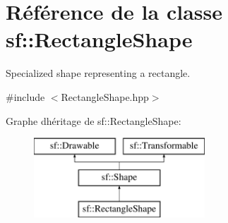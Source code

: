 \hypertarget{classsf_1_1RectangleShape}{}\section{Référence de la classe sf\+:\+:Rectangle\+Shape}
\label{classsf_1_1RectangleShape}


Specialized shape representing a rectangle.  




{\ttfamily \#include $<$Rectangle\+Shape.\+hpp$>$}

Graphe d\textquotesingle{}héritage de sf\+:\+:Rectangle\+Shape\+:\begin{figure}[H]
\begin{center}
\leavevmode
\includegraphics[height=3.000000cm]{classsf_1_1RectangleShape}
\end{center}
\end{figure}
